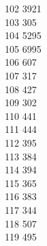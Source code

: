 { 102	3921 \\
 103	305 \\
 104	5295 \\
 105	6995 \\
 106	607 \\
 107	317 \\
 108	427 \\
 109	302 \\
 110	441 \\
 111	444 \\
 112	395 \\
 113	384 \\
 114	394 \\
 115	365 \\
 116	383 \\
 117	344 \\
 118	507 \\
 119	495 \\
}
